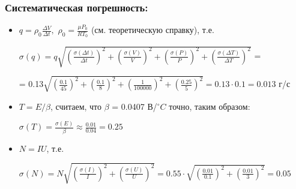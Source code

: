 \documentclass[a4paper,17pt]{article}
\begin{document}
        \subsubsection{Систематическая погрешность:}
            
            \begin{itemize}
                \item 
                    $q=\rho_0\frac{\Delta V}{\Delta t}, $
                    $\rho_0=\frac{\mu P_0}{RT_0}$ (см. теоретическую справку), т.е.
                    
                \begin{center}
                    $\sigma(q) = q\sqrt{(\frac{\sigma(\Delta t)}{\Delta t})^2 + (\frac{\sigma(V)}{V})^2 + (\frac{\sigma(P)}{P})^2 + (\frac{\sigma (\Delta T)}{\Delta T})^2}$ =
                    
                    = 0.13$\sqrt{(\frac{0.1}{45})^2 + (\frac{0.1}{8})^2 + (\frac{1}{100000})^2 + (\frac{0.25}{5})^2} = 0.13 \cdot 0.1 = 0.013$ г/с
                \end{center}
                
                \item 
                $T = E / \beta$, считаем, что $\beta$ = 0.0407 В/$^\circ C$ точно, таким образом: 
                
                \begin{center}
                     $\sigma(T) = \frac{\sigma(E)}{\beta} \approx \frac{0.01}{0.04} = 0.25$ 
                \end{center}
                
                \item
                $N = IU$, т.е.     
                
                \begin{center}
                    $\sigma(N) = N\sqrt{(\frac{\sigma(I)}{I})^2 + (\frac{\sigma(U)}{U})^2} = 0.55\cdot \sqrt{(\frac{0.01}{0.1})^2+(\frac{0.01}{3})^2} = 0.05$
                \end{center}
                
            \end{itemize}
            
\end{document}
